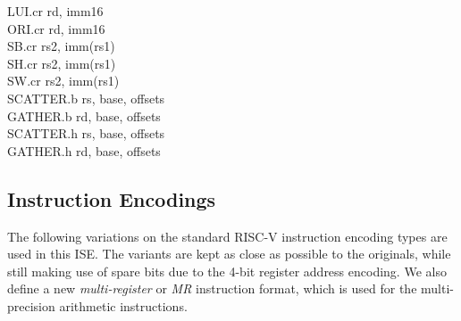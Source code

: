 {LUI.cr      rd,  imm16              \\
ORI.cr      rd,  imm16              \\
SB.cr       rs2, imm(rs1)           \\
SH.cr       rs2, imm(rs1)           \\
SW.cr       rs2, imm(rs1)           \\
SCATTER.b   rs, base, offsets       \\
GATHER.b    rd, base, offsets       \\
SCATTER.h   rs, base, offsets       \\
GATHER.h    rd, base, offsets       \\
}

\newpage
\subsection{Instruction Encodings}

The following variations on the standard RISC-V instruction encoding types are
used in this ISE. The variants are kept as close as possible to the originals,
while still making use of spare bits due to the 4-bit register address encoding.
We also define a new {\em multi-register} or {\em MR} instruction format, which
is used for the multi-precision arithmetic instructions.

